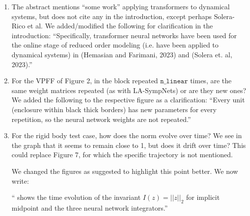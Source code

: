 \documentclass{article}
\begin{document}
\begin{enumerate}
    \item The abstract mentions ``some work'' applying transformers to dynamical systems, but does not cite any in the introduction, except perhaps Solera-Rico et al.
        {\color{mred} We added/modified the following for clarification in the introduction: ``Specifically, transformer neural networks have been used for the online stage of reduced order modeling (i.e. have been applied to dynamical systems) in (Hemasian and Farimani, 2023) and (Solera et. al, 2023).''}
    \item For the VPFF of Figure 2, in the block repeated $\mathtt{n\_linear}$ times, are the same weight matrices repeated (as with LA-SympNets) or are they new ones?
        {\color{mred} We added the following to the respective figure as a clarification: ``Every unit (enclosure within black thick borders) has new parameters for every repetition, so the neural network weights are not repeated.''}
    \item For the rigid body test case, how does the norm evolve over time? We see in the graph that it seems to remain close to 1, but does it drift over time? This could replace Figure 7, for which the specific trajectory is not mentioned.
    
        {\color{mred} We changed the figures as suggested to highlight this point better. We now write:
        
        `` shows the time evolution of the invariant $I(z) = ||z||_2$ for implicit midpoint and the three neural network integrators.''

}
\end{enumerate}
\end{document}
